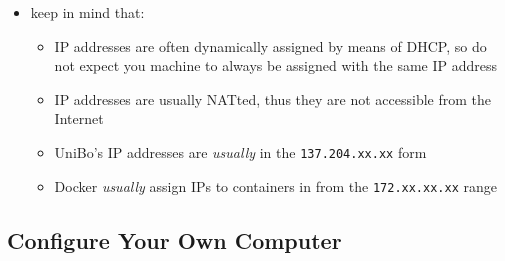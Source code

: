 \documentclass[handout]{beamer}\mode<presentation>{\usetheme{AMSBolognaFC}}
\begin{document}
\begin{frame}[allowframebreaks]
    \framebreak
    \begin{itemize}
    \item keep in mind that:
    \begin{itemize}
    	\item IP addresses are often dynamically assigned by means of DHCP, so \alert{do not expect} you machine to always be assigned with the same IP address
    	\item IP addresses are usually NATted, thus they are not accessible from the Internet
    	\item UniBo's IP addresses are \emph{usually} in the \texttt{137.204.xx.xx} form
    	\item Docker \emph{usually} assign IPs to containers in from the \texttt{172.xx.xx.xx} range
    \end{itemize}
	\end{itemize}

\end{frame}

\subsection{Configure Your Own Computer}
\end{document}
